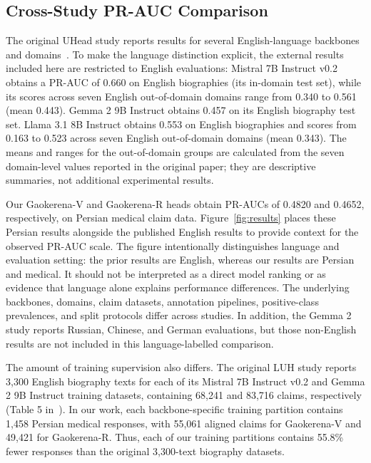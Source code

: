 \documentclass[conference,a4paper]{IEEEtran}
\begin{document}
\subsection{Cross-Study PR-AUC Comparison}
The original UHead study reports results for several English-language backbones and domains~\cite{b1}. To make the language distinction explicit, the external results included here are restricted to English evaluations: Mistral 7B Instruct v0.2 obtains a PR-AUC of 0.660 on English biographies (its in-domain test set), while its scores across seven English out-of-domain domains range from 0.340 to 0.561 (mean 0.443). Gemma 2 9B Instruct obtains 0.457 on its English biography test set. Llama 3.1 8B Instruct obtains 0.553 on English biographies and scores from 0.163 to 0.523 across seven English out-of-domain domains (mean 0.343). The means and ranges for the out-of-domain groups are calculated from the seven domain-level values reported in the original paper; they are descriptive summaries, not additional experimental results.

Our Gaokerena-V and Gaokerena-R heads obtain PR-AUCs of 0.4820 and 0.4652, respectively, on Persian medical claim data. Figure~\ref{fig:results} places these Persian results alongside the published English results to provide context for the observed PR-AUC scale. The figure intentionally distinguishes language and evaluation setting: the prior results are English, whereas our results are Persian and medical. It should not be interpreted as a direct model ranking or as evidence that language alone explains performance differences. The underlying backbones, domains, claim datasets, annotation pipelines, positive-class prevalences, and split protocols differ across studies. In addition, the Gemma 2 study reports Russian, Chinese, and German evaluations, but those non-English results are not included in this language-labelled comparison.

The amount of training supervision also differs. The original LUH study reports 3,300 English biography texts for each of its Mistral 7B Instruct v0.2 and Gemma 2 9B Instruct training datasets, containing 68,241 and 83,716 claims, respectively (Table 5 in~\cite{b1}). In our work, each backbone-specific training partition contains 1,458 Persian medical responses, with 55,061 aligned claims for Gaokerena-V and 49,421 for Gaokerena-R. Thus, each of our training partitions contains 55.8\% fewer responses than the original 3,300-text biography datasets.
\end{document}
